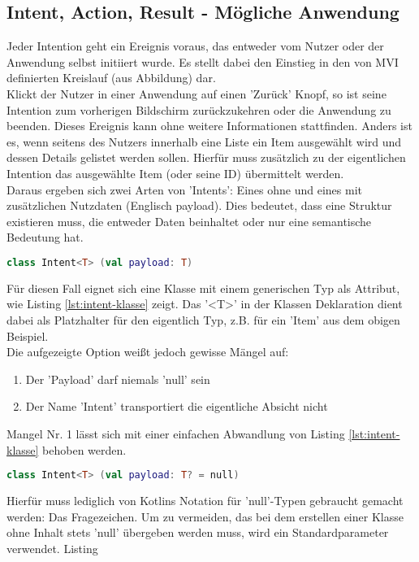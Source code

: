 \subsection{Intent, Action, Result - Mögliche Anwendung}
Jeder Intention geht ein Ereignis voraus, das entweder vom Nutzer oder der Anwendung selbst initiiert wurde. Es stellt dabei den Einstieg in den von MVI definierten Kreislauf (aus Abbildung) dar. 
\\
Klickt der Nutzer in einer Anwendung auf einen 'Zurück' Knopf, so ist seine Intention zum vorherigen Bildschirm zurückzukehren oder die Anwendung zu beenden. Dieses Ereignis kann ohne weitere Informationen stattfinden. Anders ist es, wenn seitens des Nutzers innerhalb eine Liste ein Item ausgewählt wird und dessen Details gelistet werden sollen. Hierfür muss zusätzlich zu der eigentlichen Intention das ausgewählte Item (oder seine ID) übermittelt werden.
\\
Daraus ergeben sich zwei Arten von 'Intents': Eines ohne und eines mit zusätzlichen Nutzdaten (Englisch payload). Dies bedeutet, dass eine Struktur existieren muss, die entweder Daten beinhaltet oder nur eine semantische Bedeutung hat.
\begin{lstlisting}[caption={Intent Klasse}, label={lst:intent-klasse}, language=Kotlin]
class Intent<T> (val payload: T)
\end{lstlisting}
\bigskip
Für diesen Fall eignet sich eine Klasse mit einem generischen Typ als Attribut, wie Listing
\ref{lst:intent-klasse}
zeigt. Das '<T>' in der Klassen Deklaration dient dabei als Platzhalter für den eigentlich Typ, z.B. für ein 'Item' aus dem obigen Beispiel.
\\
Die aufgezeigte Option weißt jedoch gewisse Mängel auf:
\begin{enumerate}
	\item Der 'Payload' darf niemals 'null' sein
	\item Der Name 'Intent' transportiert die eigentliche Absicht nicht
\end{enumerate}
\bigskip
Mangel Nr. 1 lässt sich mit einer einfachen Abwandlung von Listing
\ref{lst:intent-klasse}
behoben werden. 
\begin{lstlisting}[caption={Intent Klasse}, label={lst:intent-klasse-2}, language=Kotlin]
class Intent<T> (val payload: T? = null)
\end{lstlisting}
\bigskip
Hierfür muss lediglich von Kotlins Notation für 'null'-Typen gebraucht gemacht werden: Das Fragezeichen. Um zu vermeiden, das bei dem erstellen einer Klasse ohne Inhalt stets 'null' übergeben werden muss, wird ein Standardparameter verwendet. Listing

